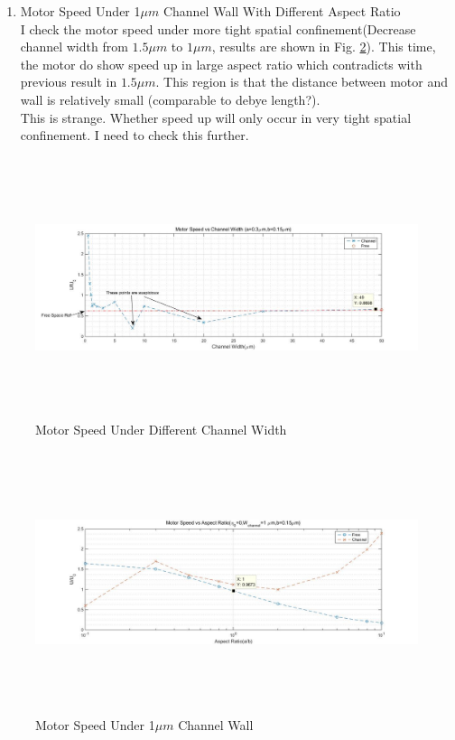 \documentclass[fontsize=11pt, %
                             paper=a4, %
                             twoside, %
                             captions=tableheading,
                             index=totoc,
                             hyperref]{labbook}
\begin{document}
\begin{addmargin}[4cm]{0cm}
\begin{enumerate}
\item
Motor Speed Under 1$\mu m$ Channel Wall With Different Aspect Ratio\\
I check the motor speed under more tight spatial confinement(Decrease channel width from $1.5 \mu m$ to $1 \mu m$, results are shown in Fig. \ref{2016-11-5-MSU1CW}). This time, the motor do show speed up in large aspect ratio which contradicts with previous result in $1.5\mu m$. This region is that the distance between motor and wall is relatively small (comparable to debye length?). \\
This is strange. Whether speed up will only occur in very tight spatial confinement. I need to check this further. 
\end{enumerate}
\begin{figure}
\centering
\includegraphics[width=\linewidth, height=3in]{2016-11-5-diff-channel-width.jpg}
\caption{Motor Speed Under Different Channel Width}\label{2016-11-5-MSUDCW}
\end{figure}

\begin{figure}
\centering
\includegraphics[width=\linewidth, height=3in]{2016-11-5-eta-0-wall-1.jpg}
\caption{Motor Speed Under 1$\mu m$ Channel Wall}\label{2016-11-5-MSU1CW}
\end{figure}

\end{addmargin}
\end{document}
